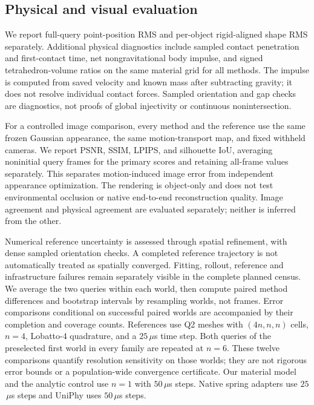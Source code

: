 \subsection{Physical and visual evaluation}
We report full-query point-position RMS and per-object rigid-aligned shape
RMS separately. Additional physical diagnostics include sampled contact
penetration and first-contact time, net nongravitational body impulse,
and signed tetrahedron-volume ratios on the same material grid for all
methods. The impulse is computed from saved velocity and known mass after
subtracting gravity; it does not resolve individual contact forces.
Sampled orientation and gap checks are diagnostics, not proofs of global
injectivity or continuous nonintersection.

For a controlled image comparison, every method and the reference use the
same frozen Gaussian appearance, the same motion-transport map, and fixed
withheld cameras. We report PSNR, SSIM, LPIPS, and silhouette IoU, averaging
noninitial query frames for the primary scores and retaining all-frame
values separately.
This separates motion-induced image error from independent appearance
optimization. The rendering is object-only and does not test environmental
occlusion or native end-to-end reconstruction quality. Image agreement and
physical agreement are evaluated separately; neither is inferred from the
other.

Numerical reference uncertainty is assessed through spatial refinement,
with dense sampled orientation checks. A completed reference trajectory is
not automatically treated as spatially converged. Fitting, rollout,
reference and infrastructure failures remain separately visible in the
complete planned census. We average the two queries within each world,
then compute paired method differences and bootstrap intervals by resampling
worlds, not frames. Error comparisons conditional on successful paired
worlds are accompanied by their completion and coverage counts.
References use Q2 meshes with $(4n,n,n)$ cells, $n=4$, Lobatto-4 quadrature,
and a $25$\,$\mu$s time step. Both queries of the preselected first world
in every family are repeated at $n=6$. These twelve comparisons quantify
resolution sensitivity on those worlds; they are not rigorous error bounds
or a population-wide convergence certificate. Our material model and the
analytic control use $n=1$ with $50$\,$\mu$s steps. Native spring adapters
use $25$\,$\mu$s steps and UniPhy uses $50$\,$\mu$s steps.
